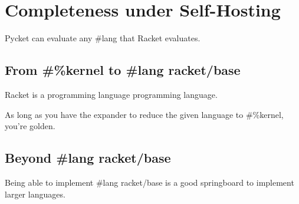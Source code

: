 	\section{Completeness under Self-Hosting}

		\begin{mainpoint}
			Pycket can evaluate any \#lang that Racket evaluates.
		\end{mainpoint}

		\subsection{From \#\%kernel to \#lang racket/base}
			\begin{mainpoint}
				Racket is a programming language programming language.

				As long as you have the expander to reduce the given language to \#\%kernel, you're golden.
			\end{mainpoint}

		\subsection{Beyond \#lang racket/base}
			\begin{mainpoint}
				Being able to implement \#lang racket/base is a good springboard to implement larger languages.
			\end{mainpoint}